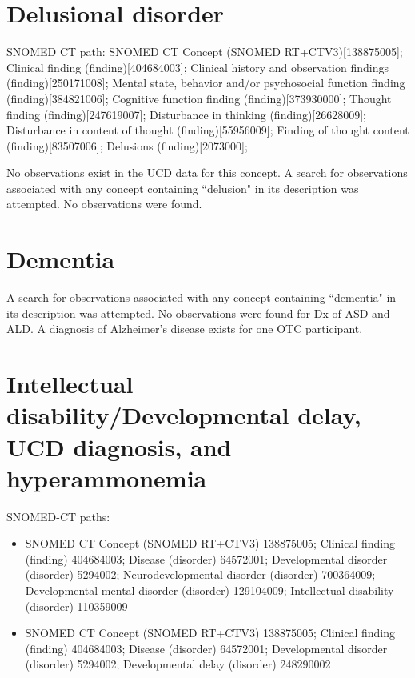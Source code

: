 \documentclass[10pt, letterpaper]{article}
\begin{document}
\begin{spacing}{1.0}
\clearpage

\section{Delusional disorder}

\vspace{10pt}

SNOMED CT path:  \small SNOMED CT Concept (SNOMED RT+CTV3)[138875005]; Clinical finding (finding)[404684003]; Clinical history and observation findings (finding)[250171008]; Mental state, behavior and/or psychosocial function finding (finding)[384821006]; Cognitive function finding (finding)[373930000]; Thought finding (finding)[247619007]; Disturbance in thinking (finding)[26628009]; Disturbance in content of thought (finding)[55956009]; Finding of thought content (finding)[83507006]; Delusions (finding)[2073000];\\
\normalsize

No observations exist in the UCD data for this concept.  A search for observations associated with any concept containing ``delusion" in its description was attempted.  No observations were found.

\clearpage

\section{Dementia}

\vspace{10pt}

A search for observations associated with any concept containing ``dementia" in its description was attempted.  No observations were found for Dx of ASD and ALD.  A diagnosis of Alzheimer's disease exists for one OTC participant.

\clearpage

\section{Intellectual disability/Developmental delay, UCD diagnosis, and hyperammonemia}\label{sec:ID}

\vspace{10pt}

SNOMED-CT paths:

\small
\begin{itemize}
    \item SNOMED CT Concept (SNOMED RT+CTV3) 138875005; Clinical finding (finding) 404684003; Disease (disorder) 64572001; Developmental disorder (disorder) 5294002; Neurodevelopmental disorder (disorder) 700364009; Developmental mental disorder (disorder) 129104009; Intellectual disability (disorder) 110359009
    \item SNOMED CT Concept (SNOMED RT+CTV3) 138875005; Clinical finding (finding) 404684003; Disease (disorder) 64572001; Developmental disorder (disorder) 5294002; Developmental delay (disorder) 248290002
\end{itemize}
\normalsize


\end{spacing}
\end{document}

